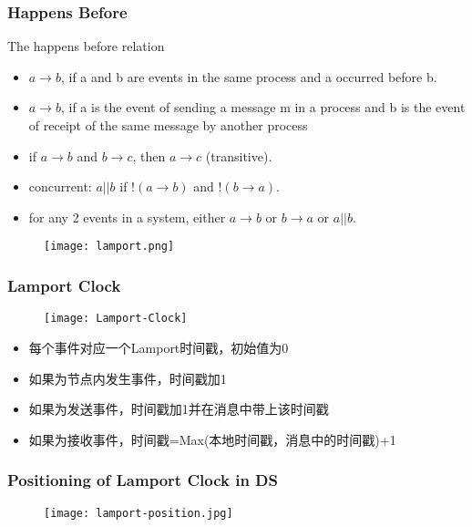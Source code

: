 \begin{frame}
    \frametitle{Happens Before}
    \begin{block}{The happens before \to relation}
        \begin{itemize}
            \item $a \to b$, if a and b are events in the same process and a occurred before b.
            \item $a \to b$, if a is the event of sending a message m in a process and b is the event of receipt of the same message by another process
            \item if $a \to b$ and $b \to c$, then $a \to c$ (transitive).
            \item concurrent: $ a || b$ if $!(a \to b)$ and $!(b \to a)$.
            \item for any 2 events in a system, either $a \to b$ or $b \to a$ or $a || b$.
        \end{itemize}
    \end{block}
    \begin{figure}
        \centering
        \texttt{[image: lamport.png]}
    \end{figure}
\end{frame}

\begin{frame}
    \frametitle{Lamport Clock}
    \begin{figure}
        \centering
        \texttt{[image: Lamport-Clock]}
    \end{figure}
    \begin{itemize}
        \item 每个事件对应一个Lamport时间戳，初始值为0
        \item 如果为节点内发生事件，时间戳加1
        \item 如果为发送事件，时间戳加1并在消息中带上该时间戳
        \item 如果为接收事件，时间戳=Max(本地时间戳，消息中的时间戳)+1
    \end{itemize}
\end{frame}

\begin{frame}
    \frametitle{Positioning of Lamport Clock in DS}
    \begin{figure}
        \centering
        \texttt{[image: lamport-position.jpg]}
    \end{figure}
\end{frame}

